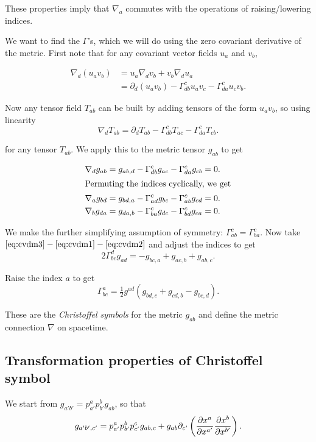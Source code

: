 \documentclass{notes}
\newcommand{\del}{\nabla}
\begin{document}
These properties imply that $\del_a$ commutes with the operations of
raising/lowering indices.

We want to find the $\Gamma$'s, which we will do using the zero
covariant derivative of the metric.  First note that for any covariant
vector fields $u_a$ and $v_b$,

\begin{align*}
\del_d (u_a v_b) &= u_a \del_d v_b + v_b \del_d
u_a \\
&= \partial_d (u_a v_b) - \Gamma^c_{d b} u_a
v_c - \Gamma^c_{d a} u_c v_b.
\end{align*}

Now any tensor field $T_{a b}$ can be built by adding tensors of
the form $u_a v_b$, so using linearity
\[
\del_d T_{a b} = \partial_d T_{a b} -
\Gamma^c_{d b} T_{a c} - \Gamma^c_{d a}
T_{c b}.
\]

for any tensor $T_{a b}$.  We apply this to the metric tensor
$g_{a b}$ to get

\begin{align}
\del_d g_{a b} &= g_{a b,d} - \Gamma^c_{d b}
g_{a c} - \Gamma^c_{d a} g_{c b} = 0.
\label{eq:cvdm1} \\
\intertext{Permuting the indices cyclically, we get}
\del_a g_{b d} &= g_{b d,a} - \Gamma^c_{a d}
g_{b c} - \Gamma^c_{a b} g_{c d} = 0.
\label{eq:cvdm2} \\
\del_b g_{d a} &= g_{d a,b} - \Gamma^c_{b a}
g_{d c} - \Gamma^c_{b d} g_{c a} = 0.
\label{eq:cvdm3}
\end{align}

We make the further simplifying assumption of symmetry:
$\Gamma^c_{a b} = \Gamma^c_{b a}$.  Now take
$\eqref{eq:cvdm3} - \eqref{eq:cvdm1} - \eqref{eq:cvdm2}$ and adjust
the indices to get
\[
2 \Gamma^d_{bc} g_{ad} = - g_{bc,a} + g_{ac,b} + g_{ab,c}.
\]

Raise the index $a$ to get
\begin{equation}\label{eq:chrsym}
\Gamma^a_{bc} = \tfrac{1}{2} g^{ad} ( g_{bd,c} + g_{cd,b} - g_{bc,d}).
\end{equation} 

These are the \emph{Christoffel symbols} for the metric $g_{ab}$ and
define the metric connection $\del$ on spacetime.

\subsection{Transformation properties of Christoffel symbol}

We start from $g_{a'b'} = p^a_{a'} p^b_{b'} g_{ab}$, so that
\[
g_{a'b',c'} = p^a_{a'} p^b_{b'} p^c_{c'} g_{ab,c} + g_{ab}
\partial_{c'} \left( \frac{\partial x^a}{\partial x^{a'}} \frac{\partial x^b}{\partial x^{b'}}\right). 
\]
\end{document}
